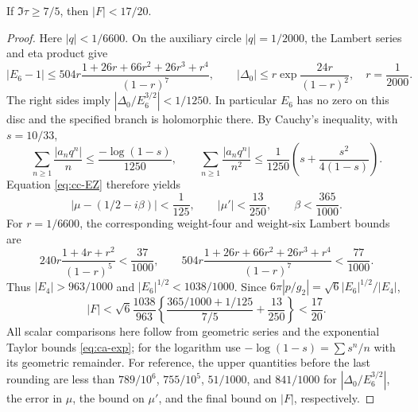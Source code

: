 \begin{statement}
If $\Im\tau\ge7/5$, then $|F|<17/20$.
\end{statement}
\begin{proof}
Here $|q|<1/6600$. On the auxiliary circle $|q|=1/2000$,
the Lambert series and eta product give
\[
 |E_6-1|\le
 504r\frac{1+26r+66r^2+26r^3+r^4}{(1-r)^7},\qquad
 |\Delta_0|\le r\exp\!\frac{24r}{(1-r)^2},
 \quad r=\frac1{2000}.
\]
The right sides imply $|\Delta_0/E_6^{3/2}|<1/1250$.
In particular $E_6$ has no zero on this disc and the specified
branch is holomorphic there. By Cauchy's inequality, with
$s=10/33$,
\[
 \sum_{n\ge1}\frac{|a_nq^n|}{n}
 \le\frac{-\log(1-s)}{1250},\qquad
 \sum_{n\ge1}\frac{|a_nq^n|}{n^2}
 \le\frac1{1250}\left(s+\frac{s^2}{4(1-s)}\right).
\]
Equation \eqref{eq:cc-EZ} therefore yields
\[
 |\mu-(1/2-i\beta)|<\frac1{125},\qquad
 |\mu'|<\frac{13}{250},\qquad \beta<\frac{365}{1000}.
\]
For $r=1/6600$, the corresponding weight-four and weight-six
Lambert bounds are
\[
 240r\frac{1+4r+r^2}{(1-r)^5}<\frac{37}{1000},\qquad
 504r\frac{1+26r+66r^2+26r^3+r^4}{(1-r)^7}
       <\frac{77}{1000}.
\]
Thus $|E_4|>963/1000$ and $|E_6|^{1/2}<1038/1000$.
Since $6\pi|p/g_2|=\sqrt6|E_6|^{1/2}/|E_4|$,
\begin{equation}\label{eq:cc-cuspbound}
 |F|<\sqrt6\frac{1038}{963}
 \left\{\frac{365/1000+1/125}{7/5}+\frac{13}{250}\right\}
 <\frac{17}{20}.
\end{equation}
All scalar comparisons here follow from geometric series and
the exponential Taylor bounds \eqref{eq:ca-exp}; for the logarithm
use $-\log(1-s)=\sum s^n/n$ with its geometric remainder.
For reference, the upper quantities before the last rounding are
less than $789/10^6$, $755/10^5$, $51/1000$, and $841/1000$
for $|\Delta_0/E_6^{3/2}|$, the error in $\mu$, the bound on
$\mu'$, and the final bound on $|F|$, respectively.
\end{proof}

